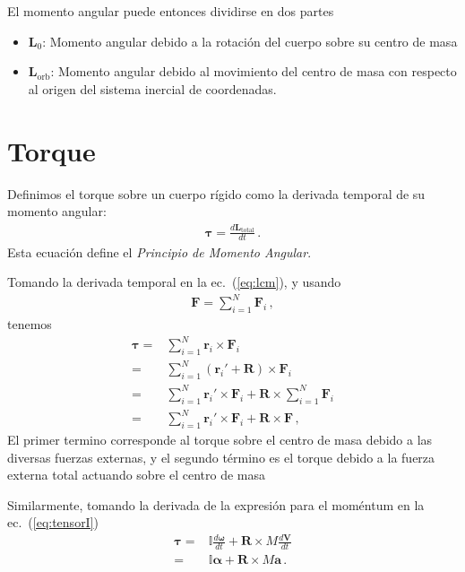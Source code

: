 El momento angular puede entonces dividirse en dos partes
\begin{itemize}
\item $\mathbf{L}_0$: Momento angular debido a la rotación del cuerpo sobre su centro de masa
\item $\mathbf{L}_{\text{orb}}$: Momento angular debido al movimiento del centro de masa con respecto al origen del sistema inercial de coordenadas.
\end{itemize}


\section{Torque}

Definimos el torque sobre un cuerpo rígido como la derivada temporal de su momento angular:
\begin{align}
  \label{eq:torque}
  \boldsymbol{\tau}=\frac{d\mathbf{L}_{\mathrm{total}}}{dt}\,.
\end{align}
Esta ecuación define el \emph{Principio de Momento Angular}. 

Tomando la derivada temporal en la ec.~(\ref{eq:lcm}), y usando
\begin{align}
  \mathbf{F}=\sum_{i=1}^N\mathbf{F}_i\,,
\end{align}
tenemos
\begin{align}
  \boldsymbol{\tau}=&\sum_{i=1}^N\mathbf{r}_i\times \mathbf{F}_i\nonumber\\
=&\sum_{i=1}^N\left(\mathbf{r}_i'+\mathbf{R}\right)\times \mathbf{F}_i\nonumber\\
=&\sum_{i=1}^N\mathbf{r}_i'\times \mathbf{F}_i+\mathbf{R}\times \sum_{i=1}^N\mathbf{F}_i\nonumber\\
=&\sum_{i=1}^N\mathbf{r}_i'\times \mathbf{F}_i+\mathbf{R}\times\mathbf{F}\,,
\end{align}
El primer termino corresponde al torque sobre el centro de masa debido a las diversas fuerzas externas, y el segundo término es el torque debido a la fuerza externa total actuando sobre el centro de masa

Similarmente, tomando la derivada de la expresión para el moméntum en la ec.~(\ref{eq:tensorI})
\begin{align}
  \boldsymbol{\tau}=&\mathbb{I}\frac{d\boldsymbol{\omega}}{dt}+\mathbf{R}\times M\frac{d\mathbf{V}}{dt}\nonumber\\
=&\mathbb{I}\boldsymbol{\alpha}+\mathbf{R}\times M\mathbf{a}\,.
\end{align}





